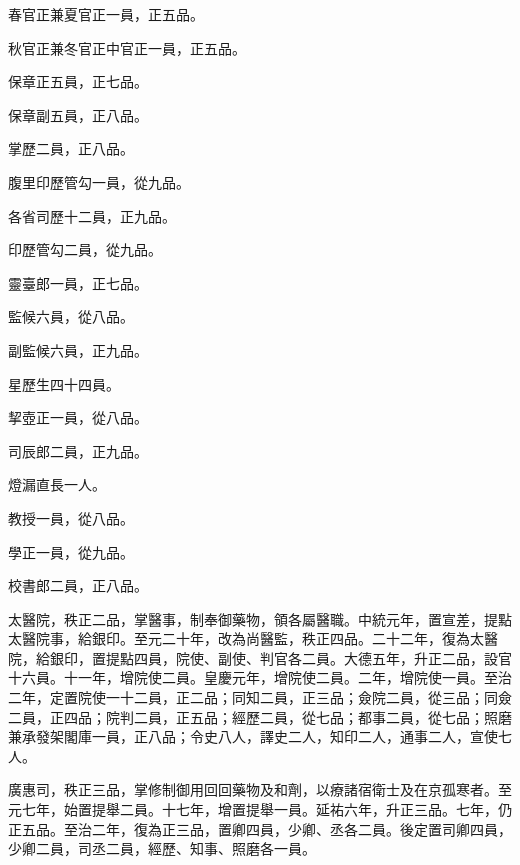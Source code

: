 \begin{pinyinscope}
 春官正兼夏官正一員，正五品。



 秋官正兼冬官正中官正一員，正五品。



 保章正五員，正七品。



 保章副五員，正八品。



 掌歷二員，正八品。



 腹里印歷管勾一員，從九品。



 各省司歷十二員，正九品。



 印歷管勾二員，從九品。



 靈臺郎一員，正七品。



 監候六員，從八品。



 副監候六員，正九品。



 星歷生四十四員。



 挈壺正一員，從八品。



 司辰郎二員，正九品。



 燈漏直長一人。



 教授一員，從八品。



 學正一員，從九品。



 校書郎二員，正八品。



 太醫院，秩正二品，掌醫事，制奉御藥物，領各屬醫職。中統元年，置宣差，提點太醫院事，給銀印。至元二十年，改為尚醫監，秩正四品。二十二年，復為太醫院，給銀印，置提點四員，院使、副使、判官各二員。大德五年，升正二品，設官十六員。十一年，增院使二員。皇慶元年，增院使二員。二年，增院使一員。至治二年，定置院使一十二員，正二品；同知二員，正三品；僉院二員，從三品；同僉二員，正四品；院判二員，正五品；經歷二員，從七品；都事二員，從七品；照磨兼承發架閣庫一員，正八品；令史八人，譯史二人，知印二人，通事二人，宣使七人。



 廣惠司，秩正三品，掌修制御用回回藥物及和劑，以療諸宿衛士及在京孤寒者。至元七年，始置提舉二員。十七年，增置提舉一員。延祐六年，升正三品。七年，仍正五品。至治二年，復為正三品，置卿四員，少卿、丞各二員。後定置司卿四員，少卿二員，司丞二員，經歷、知事、照磨各一員。




\end{pinyinscope}
